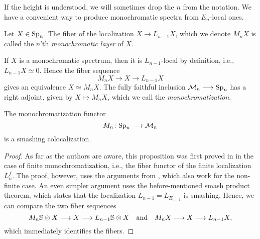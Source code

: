 If the height is understood, we will sometimes drop the $n$ from the notation. We have a convenient way to produce monochromatic spectra from $E_n$-local ones. 

\begin{definition}
    Let $X\in \sp\np$. The fiber of the localization $X\longrightarrow L_{n-1}X$, which we denote $M_n X$ is called the $n$'th \emph{monochromatic layer} of $X$. 
\end{definition}

\begin{remark}
    If $X$ is a monochromatic spectrum, then it is $L_{n-1}$-local by definition, i.e., $L_{n-1}X\simeq 0$. Hence the fiber sequence 
    \[M_n X\longrightarrow X\longrightarrow L_{n-1}X\]
    gives an equivalence $X\simeq M_n X$. The fully faithful inclusion $\M\np\longrightarrow \sp\np$ has a right adjoint, given by $X\longmapsto M_nX$, which we call the \emph{monochromatization}. 
\end{remark}

\begin{proposition}
    \label{ch0:prop:monochromatization-is-smashing}
    The monochromatization functor 
    \[M_n\colon \sp\np\longrightarrow \M\np\] 
    is a smashing colocalization. 
\end{proposition}
\begin{proof}
    As far as the authors are aware, this proposition was first proved in \cite[Sec 6.3]{bousfield_1996} in the case of finite monochromatization, i.e., the fiber functor of the finite localization $L_n^f$. The proof, however, uses the arguments from \cite[2.10]{bousfield_1979_bool}, which also work for the non-finite case. An even simpler argument uses the before-mentioned smash product theorem, which states that the localization $L_{n-1} = L_{E_{n-1}}$ is smashing. Hence, we can compare the two fiber sequences
    \[M_n \S \otimes X \longrightarrow X \longrightarrow L_{n-1}\S\otimes X \quad \text{and}\quad M_n X\longrightarrow X\longrightarrow L_{n-1} X,\]
    which immediately identifies the fibers.  
\end{proof}



